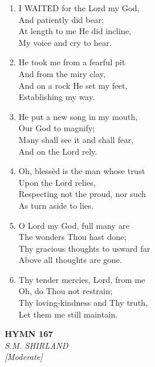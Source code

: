 \documentclass[11pt,a4paper]{article}
\begin{document}
\begin{enumerate}
    \item I WAITED for the Lord my God, \\
        And patiently did bear; \\
        At length to me He did incline, \\
        My voice and cry to hear.

    \item He took me from a fearful pit \\
        And from the miry clay, \\
        And on a rock He set my feet, \\
        Establishing my way.

    \item He put a new song in my mouth, \\
        Our God to magnify; \\
        Many shall see it and shall fear, \\
        And on the Lord rely.

    \item Oh, bless\`ed is the man whose trust \\
        Upon the Lord relies, \\
        Respecting not the proud, nor such \\
        As turn aside to lies.

    \item O Lord my God, full many are \\
        The wonders Thou hast done; \\
        Thy gracious thoughts to usward far \\
        Above all thoughts are gone.

    \item Thy tender mercies, Lord, from me \\
        Oh, do Thou not restrain; \\
        Thy loving-kindness and Thy truth, \\
        Let them me still maintain.

\end{enumerate}

\newpage
\begin{center}
    {\Large \textbf{HYMN 167}}
    \\
    \textit{S.M. SHIRLAND}
    \\
    \textit{\small [Moderate]}
\end{center}
\vspace{1em}
\end{document}
